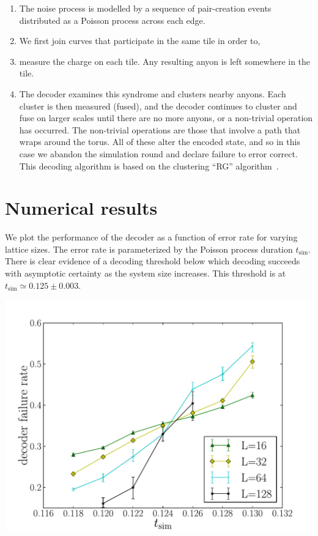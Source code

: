 \documentclass[aps, prl, letterpaper, twocolumn, superscriptaddress, notitlepage]{revtex4-1}
\begin{document}
		\begin{enumerate}
			\item The noise process is modelled by a sequence of pair-creation events distributed as a Poisson process across each edge.
			\item We first join curves that participate in the same tile in order to,
			\item measure the charge on each tile. Any resulting anyon is left somewhere in the tile.
			\item The decoder examines this syndrome and clusters nearby anyons. Each cluster is then measured (fused), and the decoder continues to cluster and fuse on larger scales until there are no more anyons, or a non-trivial operation has occurred. The non-trivial operations are those that involve a path that wraps around the torus. All of these alter the encoded state, and so in this case we abandon the simulation round and declare failure to error correct. This decoding algorithm is based on the clustering ``RG'' algorithm~\cite{Bravyi2011}.
		\end{enumerate}


\section{Numerical results}

	We plot the performance of the decoder as a function of error rate for varying lattice sizes. The error rate is parameterized by the Poisson process duration $t_{\mathrm{sim}}$. There is clear evidence of a decoding threshold below
which decoding succeeds with asymptotic certainty as the system size increases. This threshold is at $t_{\mathrm{sim}}\simeq 0.125 \pm 0.003.$

	\begin{center}\includegraphics[width=\columnwidth]{anyons-kyle.pdf}\end{center}
\end{document}
